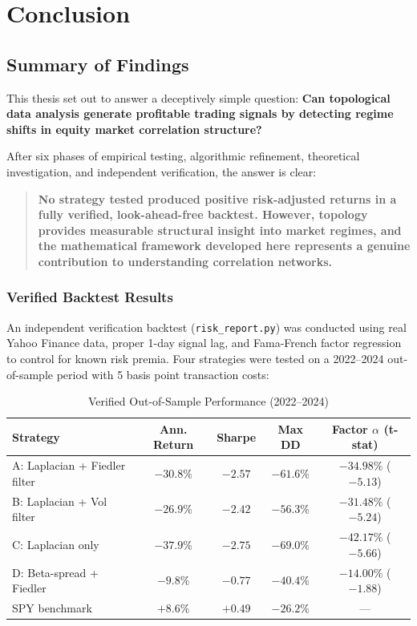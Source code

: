 \section{Conclusion}
\label{sec:conclusion}

\subsection{Summary of Findings}

This thesis set out to answer a deceptively simple question: \textbf{Can topological data analysis generate profitable trading signals by detecting regime shifts in equity market correlation structure?}

After six phases of empirical testing, algorithmic refinement, theoretical investigation, and independent verification, the answer is clear:

\begin{quote}
\textbf{No strategy tested produced positive risk-adjusted returns in a fully verified, look-ahead-free backtest. However, topology provides measurable structural insight into market regimes, and the mathematical framework developed here represents a genuine contribution to understanding correlation networks.}
\end{quote}

\subsubsection{Verified Backtest Results}

An independent verification backtest (\texttt{risk\_report.py}) was conducted using real Yahoo Finance data, proper 1-day signal lag, and Fama-French factor regression to control for known risk premia. Four strategies were tested on a 2022--2024 out-of-sample period with 5 basis point transaction costs:

\begin{table}[H]
\centering
\caption{Verified Out-of-Sample Performance (2022--2024)}
\label{tab:verified-backtest}
\begin{tabular}{@{}lcccc@{}}
\toprule
\textbf{Strategy} & \textbf{Ann. Return} & \textbf{Sharpe} & \textbf{Max DD} & \textbf{Factor $\alpha$ (t-stat)} \\
\midrule
A: Laplacian + Fiedler filter  & $-30.8\%$ & $-2.57$ & $-61.6\%$ & $-34.98\%$ ($-5.13$) \\
B: Laplacian + Vol filter      & $-26.9\%$ & $-2.42$ & $-56.3\%$ & $-31.48\%$ ($-5.24$) \\
C: Laplacian only              & $-37.9\%$ & $-2.75$ & $-69.0\%$ & $-42.17\%$ ($-5.66$) \\
D: Beta-spread + Fiedler       & $-9.8\%$  & $-0.77$ & $-40.4\%$ & $-14.00\%$ ($-1.88$) \\
SPY benchmark                  & $+8.6\%$  & $+0.49$ & $-26.2\%$ & --- \\
\bottomrule
\end{tabular}
\end{table}

